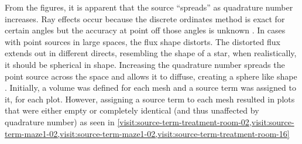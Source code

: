 \documentclass[10pt]{article}
\begin{document}
From the figures, it is apparent that the source ``spreads'' as quadrature number increases.
Ray effects occur because the discrete ordinates method is exact for certain angles but the accuracy at point off those angles is unknown \cite{slaybaugh:discretization}.
In cases with point sources in large spaces, the flux shape distorts. The distorted flux extends out in different directs, resembling the shape of a star, when realistically, it should be spherical in shape.
Increasing the quadrature number spreads the point source across the space and allows it to diffuse, creating a sphere like shape \cite{lewis-and-miller}.
Initially, a volume was defined for each mesh and a source term was assigned to it, for each plot.
However, assigning a source term to each mesh resulted in plots that were either empty or completely identical (and thus unaffected by quadrature number) as seen in \cref{visit:source-term-treatment-room-02,visit:source-term-maze1-02,visit:source-term-maze1-02,visit:source-term-treatment-room-16}
\end{document}
